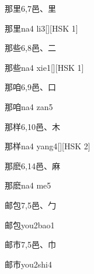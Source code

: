 \begin{entry}{那里}{6,7}{⾢、⾥}
  \begin{phonetics}{那里}{na4 li3}[][HSK 1]
  \end{phonetics}
\end{entry}

\begin{entry}{那些}{6,8}{⾢、⼆}
  \begin{phonetics}{那些}{na4 xie1}[][HSK 1]
  \end{phonetics}
\end{entry}

\begin{entry}{那咱}{6,9}{⾢、⼝}
  \begin{phonetics}{那咱}{na4 zan5}
  \end{phonetics}
\end{entry}

\begin{entry}{那样}{6,10}{⾢、⽊}
  \begin{phonetics}{那样}{na4 yang4}[][HSK 2]
  \end{phonetics}
\end{entry}

\begin{entry}{那麽}{6,14}{⾢、⿇}
  \begin{phonetics}{那麽}{na4 me5}
  \end{phonetics}
\end{entry}

\begin{entry}{邮包}{7,5}{⾢、⼓}
  \begin{phonetics}{邮包}{you2bao1}
  \end{phonetics}
\end{entry}

\begin{entry}{邮市}{7,5}{⾢、⼱}
  \begin{phonetics}{邮市}{you2shi4}
  \end{phonetics}
\end{entry}

